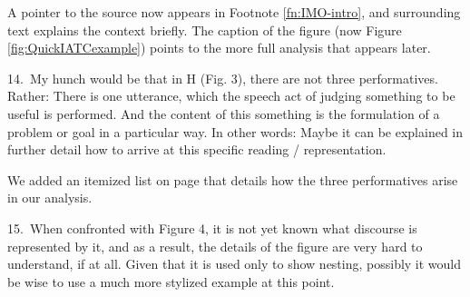 A pointer to the source now appears in Footnote \ref{fn:IMO-intro}, and surrounding text explains the context briefly.  The caption of the figure (now Figure \ref{fig:QuickIATCexample}) points to the more full analysis that appears later.

\begin{mdframed}[backgroundcolor=orange!10]
14.~My hunch would be that in H (Fig. 3), there are not three performatives. Rather: There is one utterance, which the speech act of judging something to be useful is performed. And the content of this something is the formulation of a problem or goal in a particular way. In other words: Maybe it can be explained in further detail how to arrive at this specific reading / representation. 
\end{mdframed}

We added an itemized list on page \pageref{list:example-analysis} that details how the three performatives arise in our analysis.




\begin{mdframed}[backgroundcolor=orange!10]
15.~When confronted with Figure 4, it is not yet known what discourse is represented by it, and as a result, the details of the figure are very hard to understand, if at all. Given that it is used only to show nesting, possibly it would be wise to use a much more stylized example at this point.
\end{mdframed}

